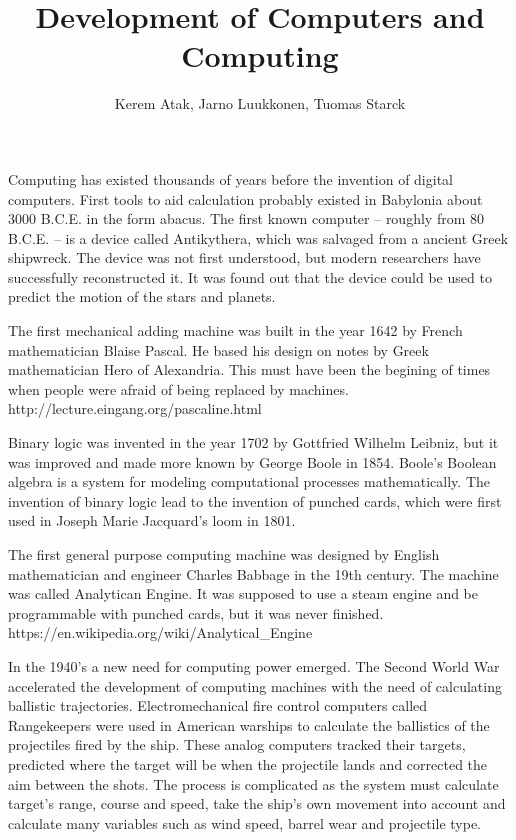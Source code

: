 \documentclass[a4paper,12pt]{article}
\begin{document}
\title{Development of Computers and Computing}
\author{Kerem Atak, Jarno Luukkonen, Tuomas Starck}
\maketitle

Computing has existed thousands of years before the invention of digital computers. First tools to aid calculation probably existed in Babylonia about 3000 B.C.E. in the form abacus\cite{js95}. The first known computer -- roughly from 80 B.C.E. -- is a device called Antikythera, which was salvaged from a ancient Greek shipwreck. The device was not first understood, but modern researchers have successfully reconstructed it. It was found out that the device could be used to predict the motion of the stars and planets\cite{amrp}.

The first mechanical adding machine was built in the year 1642 by French mathematician Blaise Pascal. He based his design on notes by Greek mathematician Hero of Alexandria. This must have been the begining of times when people were afraid of being replaced by machines.  http://lecture.eingang.org/pascaline.html

Binary logic was invented in the year 1702 by Gottfried Wilhelm Leibniz, but it was improved and made more known by George Boole in 1854. Boole's Boolean algebra is a system for modeling computational processes mathematically. The invention of binary logic lead to the invention of punched cards, which were first used in Joseph Marie Jacquard's loom in 1801.

The first general purpose computing machine was designed by English mathematician and engineer Charles Babbage in the 19th century. The machine was called Analytican Engine. It was supposed to use a steam engine and be programmable with punched cards, but it was never finished.  https://en.wikipedia.org/wiki/Analytical\_Engine

In the 1940's a new need for computing power emerged. The Second World War accelerated the development of computing machines with the need of calculating ballistic trajectories. Electromechanical fire control computers called Rangekeepers were used in American warships to calculate the ballistics of the projectiles fired by the ship. These analog computers tracked their targets, predicted where the target will be when the projectile lands and corrected the aim between the shots. The process is complicated as the system must calculate target's range, course and speed, take the ship's own movement into account and calculate many variables such as wind speed, barrel wear and projectile type.
\end{document}

